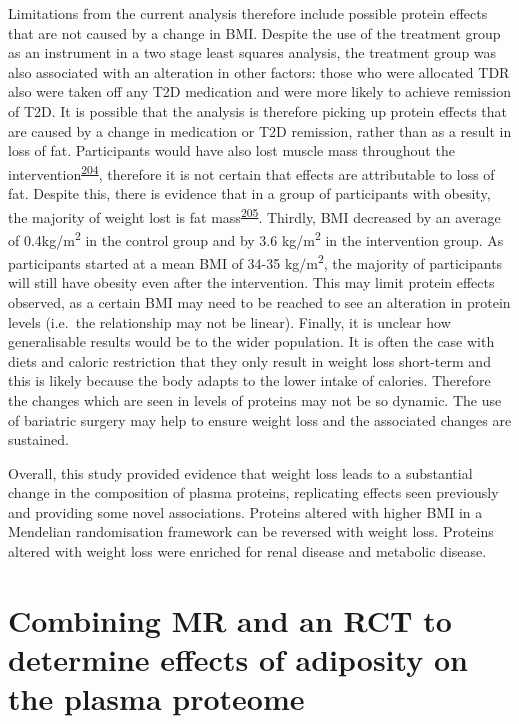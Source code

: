 \documentclass[11pt,twoside]{bristolthesis}
\begin{document}
Limitations from the current analysis therefore include possible protein effects that are not caused by a change in BMI. Despite the use of the treatment group as an instrument in a two stage least squares analysis, the treatment group was also associated with an alteration in other factors: those who were allocated TDR also were taken off any T2D medication and were more likely to achieve remission of T2D. It is possible that the analysis is therefore picking up protein effects that are caused by a change in medication or T2D remission, rather than as a result in loss of fat. Participants would have also lost muscle mass throughout the intervention\textsuperscript{\protect\hyperlink{ref-Santanasto2011}{204}}, therefore it is not certain that effects are attributable to loss of fat. Despite this, there is evidence that in a group of participants with obesity, the majority of weight lost is fat mass\textsuperscript{\protect\hyperlink{ref-Backx2016}{205}}. Thirdly, BMI decreased by an average of 0.4kg/m\textsuperscript{2} in the control group and by 3.6 kg/m\textsuperscript{2} in the intervention group. As participants started at a mean BMI of 34-35 kg/m\textsuperscript{2}, the majority of participants will still have obesity even after the intervention. This may limit protein effects observed, as a certain BMI may need to be reached to see an alteration in protein levels (i.e.~the relationship may not be linear). Finally, it is unclear how generalisable results would be to the wider population. It is often the case with diets and caloric restriction that they only result in weight loss short-term and this is likely because the body adapts to the lower intake of calories. Therefore the changes which are seen in levels of proteins may not be so dynamic. The use of bariatric surgery may help to ensure weight loss and the associated changes are sustained.

Overall, this study provided evidence that weight loss leads to a substantial change in the composition of plasma proteins, replicating effects seen previously and providing some novel associations. Proteins altered with higher BMI in a Mendelian randomisation framework can be reversed with weight loss. Proteins altered with weight loss were enriched for renal disease and metabolic disease.

\hypertarget{Comparison-proteome}{%
\chapter{Combining MR and an RCT to determine effects of adiposity on the plasma proteome}\label{Comparison-proteome}}
\end{document}
